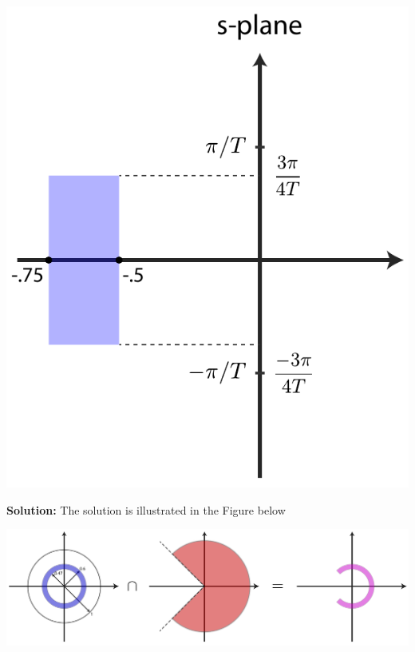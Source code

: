 \documentclass[twoside]{article}
\begin{document}
    \begin{center}
\begin{minipage}[h]{0.5\linewidth}
    \begin{center}
      \includegraphics[width=\textwidth]{example}
    \end{center}
\end{minipage}
    \end{center}
%
\textbf{Solution:} The solution is illustrated in the Figure below
%
    \begin{center}
\begin{minipage}[h]{\linewidth}
    \begin{center}
      \includegraphics[width=\textwidth]{examplesol}
    \end{center}
\end{minipage}
    \end{center}
%
\end{document}
